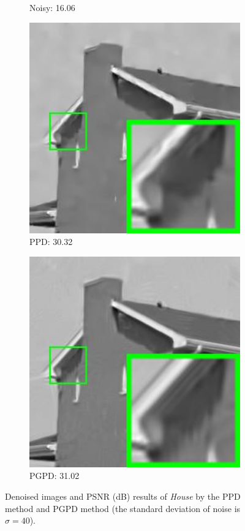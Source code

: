 \begin{figure}
\begin{subfigure}[t]{0.24\textwidth}
		\caption{Noisy: 16.06}
    \end{subfigure}
    \hfill
    \begin{subfigure}[t]{0.24\textwidth}
        \centering
        \includegraphics[width=1\textwidth]{images/pgpd/pgdpd/br_GMM65_40_house.jpg}
		\caption{PPD: 30.32}
    \end{subfigure}
    \hfill
    \begin{subfigure}[t]{0.24\textwidth}
        \centering
        \includegraphics[width=1\textwidth]{images/pgpd/pgdpd/br_our_40_house.jpg}
		\caption{PGPD: 31.02}
    \end{subfigure}
    \caption{Denoised images and PSNR (dB) results of \textsl{House} by the PPD method and PGPD method (the standard deviation of noise is $\sigma=40$).}
    \label{fig2-7}
\end{figure}



